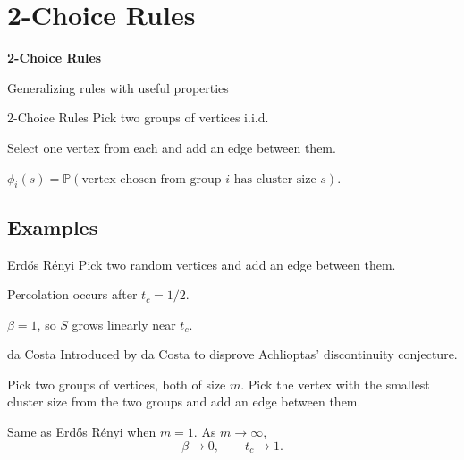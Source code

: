 \documentclass{beamer}
\newcommand{\ER}{Erd\H{o}s R\'enyi\xspace}
\begin{document}
\section{2-Choice Rules}

{
\begin{frame}
        \bfseries
        {\color{white}
                \huge 2-Choice Rules
        }
        \vspace{5mm}

        {\color{myblue}
		Generalizing rules with useful properties
        }
\end{frame}
}

\begin{frame}{2-Choice Rules}
	Pick two groups of vertices i.i.d.
	\vspace{5mm}

	Select one vertex from each and add an edge between them.
	\vspace{5mm}

	$\phi_i(s) = \mathbb{P}\left( \text{vertex chosen from group } i \text{ has cluster size } s \right) $.
\end{frame}

\subsection{Examples}

\begin{frame}{\ER}
	Pick two random vertices and add an edge between them.
	\vspace{5mm}

	\pause
	Percolation occurs after $t_c=1/2$.
	\vspace{5mm}

	$\beta=1$, so $S$ grows linearly near $t_c$.
\end{frame}

\begin{frame}{da Costa}
	Introduced by da Costa to disprove Achlioptas' discontinuity conjecture.
	\vspace{5mm}

	Pick two groups of vertices, both of size $m$. Pick the vertex with the smallest cluster size from the two groups and add an edge between them.
	\vspace{5mm}

	Same as \ER when $m=1$. As $m\to \infty$,
	\[
	\beta\to 0, \quad\quad t_c \to 1.
	\]
\end{frame}
\end{document}
